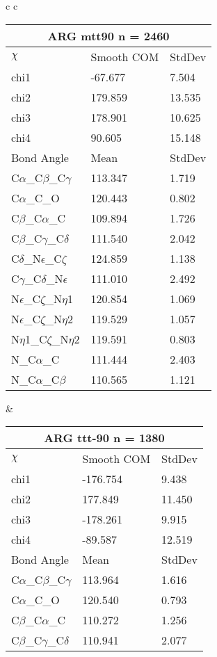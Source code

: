 \begin{longtable}{ c c }
\begin{tabular}{ l l l }
  \toprule
  \multicolumn{3}{c}{ARG \textbf{mtt90} n = 2460} \\ \toprule
  $\chi$       & Smooth COM & StdDev \\ \midrule
  chi1 & -67.677 & 7.504 \\ 
  chi2 & 179.859 & 13.535 \\ 
  chi3 & 178.901 & 10.625 \\ 
  chi4 & 90.605 & 15.148 \\ \midrule
  Bond Angle   & Mean     & StdDev \\ \midrule
  C$\alpha$\_C$\beta$\_C$\gamma$ & 113.347 & 1.719\\
  C$\alpha$\_C\_O & 120.443 & 0.802\\
  C$\beta$\_C$\alpha$\_C & 109.894 & 1.726\\
  C$\beta$\_C$\gamma$\_C$\delta$ & 111.540 & 2.042\\
  C$\delta$\_N$\epsilon$\_C$\zeta$ & 124.859 & 1.138\\
  C$\gamma$\_C$\delta$\_N$\epsilon$ & 111.010 & 2.492\\
  N$\epsilon$\_C$\zeta$\_N$\eta$1 & 120.854 & 1.069\\
  N$\epsilon$\_C$\zeta$\_N$\eta$2 & 119.529 & 1.057\\
  N$\eta$1\_C$\zeta$\_N$\eta$2 & 119.591 & 0.803\\
  N\_C$\alpha$\_C & 111.444 & 2.403\\
  N\_C$\alpha$\_C$\beta$ & 110.565 & 1.121\\
  \bottomrule
  \end{tabular}
  &
  \begin{tabular}{ l l l }
  \toprule
  \multicolumn{3}{c}{ARG \textbf{ttt-90} n = 1380} \\ \toprule
  $\chi$       & Smooth COM & StdDev \\ \midrule
  chi1 & -176.754 & 9.438 \\ 
  chi2 & 177.849 & 11.450 \\ 
  chi3 & -178.261 & 9.915 \\ 
  chi4 & -89.587 & 12.519 \\ \midrule
  Bond Angle   & Mean     & StdDev \\ \midrule
  C$\alpha$\_C$\beta$\_C$\gamma$ & 113.964 & 1.616\\
  C$\alpha$\_C\_O & 120.540 & 0.793\\
  C$\beta$\_C$\alpha$\_C & 110.272 & 1.256\\
  C$\beta$\_C$\gamma$\_C$\delta$ & 110.941 & 2.077\\

\end{tabular}
\end{longtable}

